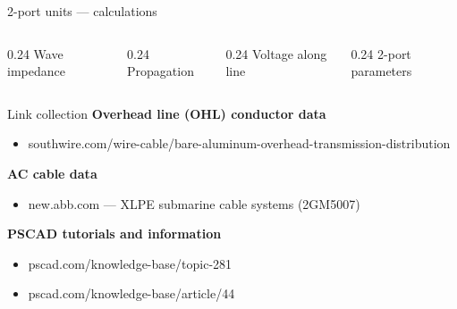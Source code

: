 \begin{frame}{2-port units --- calculations}
  \centering
  \\[0.5em]
  \begin{columns}[T,onlytextwidth]
    \begin{column}{0.24\textwidth}\centering
      {\footnotesize Wave impedance}\\[0.2em]
    \end{column}
    \begin{column}{0.24\textwidth}\centering
      {\footnotesize Propagation}\\[0.2em]
    \end{column}
    \begin{column}{0.24\textwidth}\centering
      {\footnotesize Voltage along line}\\[0.2em]
    \end{column}
    \begin{column}{0.24\textwidth}\centering
      {\footnotesize 2-port parameters}\\[0.2em]
    \end{column}
  \end{columns}
\end{frame}

\begin{frame}{Link collection}
  \textbf{Overhead line (OHL) conductor data}
  \begin{itemize}
    \item {\footnotesize southwire.com/wire-cable/bare-aluminum-overhead-transmission-distribution}
  \end{itemize}
  \textbf{AC cable data}
  \begin{itemize}
    \item {\footnotesize new.abb.com --- XLPE submarine cable systems (2GM5007)}
  \end{itemize}
  \textbf{PSCAD tutorials and information}
  \begin{itemize}
    \item {\footnotesize pscad.com/knowledge-base/topic-281}
    \item {\footnotesize pscad.com/knowledge-base/article/44}
  \end{itemize}
\end{frame}
